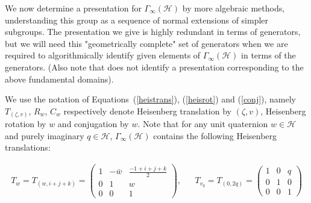 \documentclass{article}[12pt]
\begin{document}
We now determine a presentation for $\Gamma_{\infty}(\mathcal{H})$ by more algebraic methods, understanding this group as a sequence of normal extensions of simpler subgroups. The presentation we give is highly redundant in terms of generators, but we will need this "geometrically complete" set of generators when we are required to algorithmically identify given elements of  $\Gamma_{\infty}(\mathcal{H})$ in terms of the generators. (Also note that \cite{Ph} does not identify a presentation corresponding to the above fundamental domains).

We use the notation of Equations~(\ref{heistrans}), (\ref{heisrot}) and  (\ref{conj}), namely $T_{(\zeta,v)}$, $R_w$, $C_w$ respectively denote Heisenberg translation by $(\zeta,v)$, Heisenberg rotation by $w$ and conjugation by $w$. Note that for any unit quaternion $w \in \mathcal{H}$ and purely imaginary  $q \in \mathcal{H}$, $\Gamma_\infty(\mathcal{H})$ contains the following Heisenberg translations:

\begin{eqnarray}
T_w=T_{(w,i+j+k)}=\left(\begin{array}{ccc}
1 & -\bar{w} & \frac{-1+i+j+k}{2} \\
0 & 1 & w \\
0 & 0 & 1 
\end{array}\right),
& & 
T_{v_q} = T_{(0,2q)}=\left(\begin{array}{ccc}
1&0 & q\\
0& 1 & 0\\ 
0 & 0 & 1
\end{array}\right)
\end{eqnarray}
\end{document}
